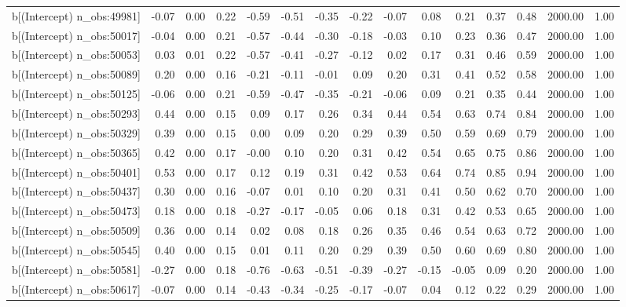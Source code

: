 \begin{table}[ht]
\begin{tabular}{rrrrrrrrrrrrrrr}
  b[(Intercept) n\_obs:49981] & -0.07 & 0.00 & 0.22 & -0.59 & -0.51 & -0.35 & -0.22 & -0.07 & 0.08 & 0.21 & 0.37 & 0.48 & 2000.00 & 1.00 \\ 
  b[(Intercept) n\_obs:50017] & -0.04 & 0.00 & 0.21 & -0.57 & -0.44 & -0.30 & -0.18 & -0.03 & 0.10 & 0.23 & 0.36 & 0.47 & 2000.00 & 1.00 \\ 
  b[(Intercept) n\_obs:50053] & 0.03 & 0.01 & 0.22 & -0.57 & -0.41 & -0.27 & -0.12 & 0.02 & 0.17 & 0.31 & 0.46 & 0.59 & 2000.00 & 1.00 \\ 
  b[(Intercept) n\_obs:50089] & 0.20 & 0.00 & 0.16 & -0.21 & -0.11 & -0.01 & 0.09 & 0.20 & 0.31 & 0.41 & 0.52 & 0.58 & 2000.00 & 1.00 \\ 
  b[(Intercept) n\_obs:50125] & -0.06 & 0.00 & 0.21 & -0.59 & -0.47 & -0.35 & -0.21 & -0.06 & 0.09 & 0.21 & 0.35 & 0.44 & 2000.00 & 1.00 \\ 
  b[(Intercept) n\_obs:50293] & 0.44 & 0.00 & 0.15 & 0.09 & 0.17 & 0.26 & 0.34 & 0.44 & 0.54 & 0.63 & 0.74 & 0.84 & 2000.00 & 1.00 \\ 
  b[(Intercept) n\_obs:50329] & 0.39 & 0.00 & 0.15 & 0.00 & 0.09 & 0.20 & 0.29 & 0.39 & 0.50 & 0.59 & 0.69 & 0.79 & 2000.00 & 1.00 \\ 
  b[(Intercept) n\_obs:50365] & 0.42 & 0.00 & 0.17 & -0.00 & 0.10 & 0.20 & 0.31 & 0.42 & 0.54 & 0.65 & 0.75 & 0.86 & 2000.00 & 1.00 \\ 
  b[(Intercept) n\_obs:50401] & 0.53 & 0.00 & 0.17 & 0.12 & 0.19 & 0.31 & 0.42 & 0.53 & 0.64 & 0.74 & 0.85 & 0.94 & 2000.00 & 1.00 \\ 
  b[(Intercept) n\_obs:50437] & 0.30 & 0.00 & 0.16 & -0.07 & 0.01 & 0.10 & 0.20 & 0.31 & 0.41 & 0.50 & 0.62 & 0.70 & 2000.00 & 1.00 \\ 
  b[(Intercept) n\_obs:50473] & 0.18 & 0.00 & 0.18 & -0.27 & -0.17 & -0.05 & 0.06 & 0.18 & 0.31 & 0.42 & 0.53 & 0.65 & 2000.00 & 1.00 \\ 
  b[(Intercept) n\_obs:50509] & 0.36 & 0.00 & 0.14 & 0.02 & 0.08 & 0.18 & 0.26 & 0.35 & 0.46 & 0.54 & 0.63 & 0.72 & 2000.00 & 1.00 \\ 
  b[(Intercept) n\_obs:50545] & 0.40 & 0.00 & 0.15 & 0.01 & 0.11 & 0.20 & 0.29 & 0.39 & 0.50 & 0.60 & 0.69 & 0.80 & 2000.00 & 1.00 \\ 
  b[(Intercept) n\_obs:50581] & -0.27 & 0.00 & 0.18 & -0.76 & -0.63 & -0.51 & -0.39 & -0.27 & -0.15 & -0.05 & 0.09 & 0.20 & 2000.00 & 1.00 \\ 
  b[(Intercept) n\_obs:50617] & -0.07 & 0.00 & 0.14 & -0.43 & -0.34 & -0.25 & -0.17 & -0.07 & 0.04 & 0.12 & 0.22 & 0.29 & 2000.00 & 1.00 \\ 

\end{tabular}
\end{table}
